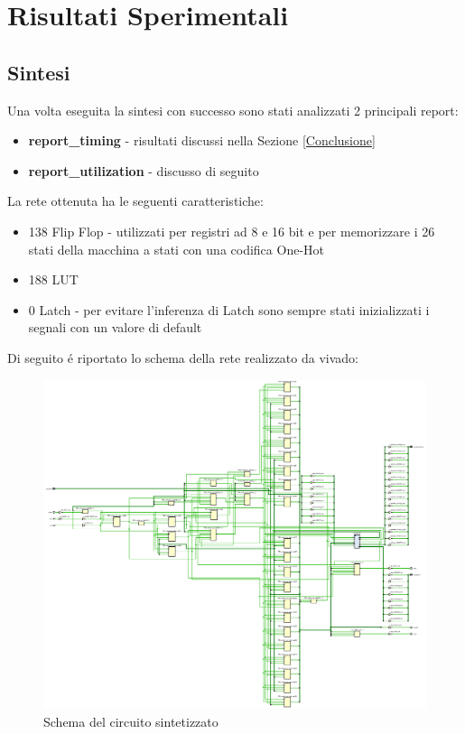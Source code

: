 \newpage
\section{Risultati Sperimentali}
\subsection{Sintesi}
Una volta eseguita la sintesi con successo sono stati analizzati 2 principali report:
\begin{itemize}
    \item \textbf{report\_timing} - risultati discussi nella Sezione \ref{Conclusione}
    \item \textbf{report\_utilization} - discusso di seguito
\end{itemize}

La rete ottenuta ha le seguenti caratteristiche: 
\begin{itemize}
    \item 138 Flip Flop - utilizzati per registri ad 8 e 16 bit e per memorizzare i 26 stati della macchina a stati con una codifica One-Hot
    \item  188 LUT
    \item  0 Latch - per evitare l'inferenza di Latch sono sempre stati inizializzati i segnali con un valore di default
\end{itemize}

Di seguito é riportato lo schema della rete realizzato da vivado:
\begin{figure}[h!]
    \centering
    \includegraphics[scale = 0.54]{Figure/Sintesi}
    \caption{Schema del circuito sintetizzato}
    \label{Sintesi}
\end{figure}

